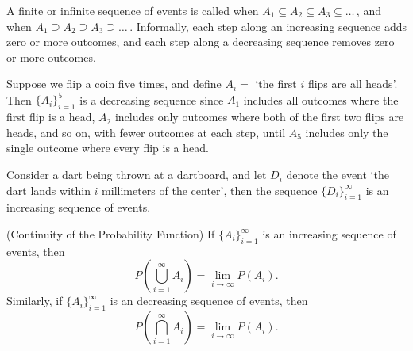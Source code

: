 A finite or infinite sequence of events is called   when $A_1 \subseteq A_2 \subseteq A_3 \subseteq \dots$\,, and   when $A_1 \supseteq A_2 \supseteq A_3 \supseteq \dots$\,. Informally, each step along an increasing sequence adds zero or more outcomes, and each step along a decreasing sequence removes zero or more outcomes.
\begin{examp} Suppose we flip a coin five times, and define $A_i =$ `the first $i$ flips are all heads'. Then $\{A_i\}_{i=1}^{5}$ is a decreasing sequence since $A_1$ includes all outcomes where the first flip is a head, $A_2$ includes only outcomes where both of the first two flips are heads, and so on, with fewer outcomes at each step, until $A_5$ includes only the single outcome where every flip is a head.
\end{examp}
\begin{examp} Consider a dart being thrown at a dartboard, and let $D_i$ denote the event `the dart lands within $i$ millimeters of the center', then the sequence $\{D_i\}_{i=1}^{\infty}$ is an increasing sequence of events.
\end{examp}
\begin{thm}\label{continuity}
(Continuity of the Probability Function) If $\{A_i\}_{i=1}^{\infty}$ is an increasing sequence of events, then 
$$P(\bigcup_{i=1}^{\infty}A_i) = \lim_{i \to \infty} P(A_i).$$
Similarly, if $\{A_i\}_{i=1}^{\infty}$ is an decreasing sequence of events, then 
$$P(\bigcap_{i=1}^{\infty}A_i) = \lim_{i \to \infty} P(A_i).$$
\end{thm}
